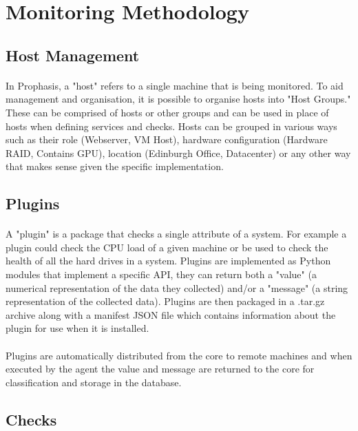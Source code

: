 \documentclass[bsc,logo,twoside]{infthesis}
\begin{document}
\section{Monitoring Methodology}
\subsection{Host Management}
\paragraph*{}
	In Prophasis, a "host" refers to a single machine that is being monitored.
	To aid management and organisation, it is possible to organise hosts into
	"Host Groups."  These can be comprised of hosts or other groups and can be
	used in place of hosts when defining services and checks.  Hosts can be
	grouped in various ways such as their role (Webserver, VM Host), hardware
	configuration (Hardware RAID, Contains GPU), location (Edinburgh Office,
	Datacenter) or any other way that makes sense given the specific
	implementation.

\subsection{Plugins}
\paragraph*{}
	A "plugin" is a package that checks a single attribute of a system.  For
	example a plugin could check the CPU load of a given machine or be used 
	to check the health of all the hard drives in a system.  Plugins are
	implemented as Python modules that implement a specific API, they can return
	both a "value" (a numerical representation of the data they collected) and/or
	a "message" (a string representation of the collected data).  Plugins are
	then packaged in a .tar.gz archive along with a manifest JSON file which 
	contains information about the plugin for use when it is installed.
	
\paragraph*{}
	Plugins are automatically distributed from the core to remote machines and
	when executed by the agent the value and message are returned to the core for
	classification and storage in the database.

\subsection{Checks}
\end{document}
